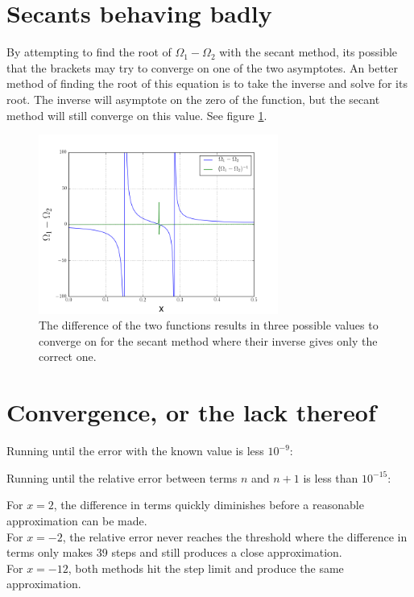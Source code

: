 \documentclass[12pt]{article}
\begin{document}
  \clearpage

  \section{Secants behaving badly}

  By attempting to find the root of $\Omega_1 - \Omega_2$ with the secant method,
  its possible that the brackets may try to converge on one of the two
  asymptotes.
  An better method of finding the root of this equation is to take the inverse
  and solve for its root. The inverse will asymptote on the zero of the 
  function, but the secant method will still converge on this value.
  See figure \ref{fig:omega}.

  \begin{figure}[h]
    \label{fig:omega}
    \centering
    \includegraphics[width=0.7\textwidth]{Problem6a.png}
    \caption{The difference of the two functions results in three possible
    values to converge on for the secant method where their inverse gives
    only the correct one.}
  \end{figure}
  

  \clearpage
  
  \section{Convergence, or the lack thereof}

  

  
  Running until the error with the known value is less $10^{-9}$:
  
  
  Running until the relative error between terms $n$ and $n+1$ is less than $10^{-15}$:
  


  For $x=2$, the difference in terms quickly diminishes before a reasonable
  approximation can be made.
  \\
  For $x=-2$, the relative error never reaches the threshold where the 
  difference in terms only makes 39 steps and still produces a close
  approximation.
  \\
  For $x=-12$, both methods hit the step limit and produce the same approximation.
\end{document}
